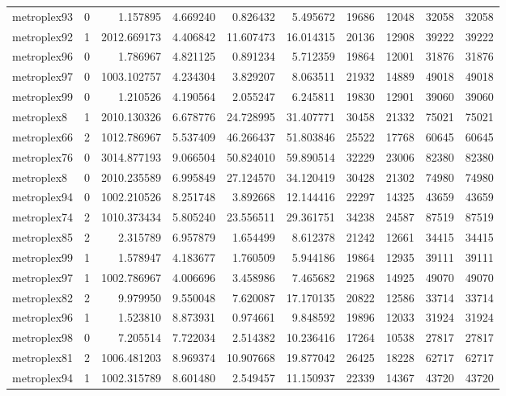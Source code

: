 \begin{longtable}{|l|r|r|r|r|r|r|r|r|r|}
metroplex93 & 0 & 1.157895 & 4.669240 & 0.826432 & 5.495672 & 19686 & 12048 & 32058 & 32058 \\
metroplex92 & 1 & 2012.669173 & 4.406842 & 11.607473 & 16.014315 & 20136 & 12908 & 39222 & 39222 \\
metroplex96 & 0 & 1.786967 & 4.821125 & 0.891234 & 5.712359 & 19864 & 12001 & 31876 & 31876 \\
metroplex97 & 0 & 1003.102757 & 4.234304 & 3.829207 & 8.063511 & 21932 & 14889 & 49018 & 49018 \\
metroplex99 & 0 & 1.210526 & 4.190564 & 2.055247 & 6.245811 & 19830 & 12901 & 39060 & 39060 \\
metroplex8 & 1 & 2010.130326 & 6.678776 & 24.728995 & 31.407771 & 30458 & 21332 & 75021 & 75021 \\
metroplex66 & 2 & 1012.786967 & 5.537409 & 46.266437 & 51.803846 & 25522 & 17768 & 60645 & 60645 \\
metroplex76 & 0 & 3014.877193 & 9.066504 & 50.824010 & 59.890514 & 32229 & 23006 & 82380 & 82380 \\
metroplex8 & 0 & 2010.235589 & 6.995849 & 27.124570 & 34.120419 & 30428 & 21302 & 74980 & 74980 \\
metroplex94 & 0 & 1002.210526 & 8.251748 & 3.892668 & 12.144416 & 22297 & 14325 & 43659 & 43659 \\
metroplex74 & 2 & 1010.373434 & 5.805240 & 23.556511 & 29.361751 & 34238 & 24587 & 87519 & 87519 \\
metroplex85 & 2 & 2.315789 & 6.957879 & 1.654499 & 8.612378 & 21242 & 12661 & 34415 & 34415 \\
metroplex99 & 1 & 1.578947 & 4.183677 & 1.760509 & 5.944186 & 19864 & 12935 & 39111 & 39111 \\
metroplex97 & 1 & 1002.786967 & 4.006696 & 3.458986 & 7.465682 & 21968 & 14925 & 49070 & 49070 \\
metroplex82 & 2 & 9.979950 & 9.550048 & 7.620087 & 17.170135 & 20822 & 12586 & 33714 & 33714 \\
metroplex96 & 1 & 1.523810 & 8.873931 & 0.974661 & 9.848592 & 19896 & 12033 & 31924 & 31924 \\
metroplex98 & 0 & 7.205514 & 7.722034 & 2.514382 & 10.236416 & 17264 & 10538 & 27817 & 27817 \\
metroplex81 & 2 & 1006.481203 & 8.969374 & 10.907668 & 19.877042 & 26425 & 18228 & 62717 & 62717 \\
metroplex94 & 1 & 1002.315789 & 8.601480 & 2.549457 & 11.150937 & 22339 & 14367 & 43720 & 43720 \\

\end{longtable}
